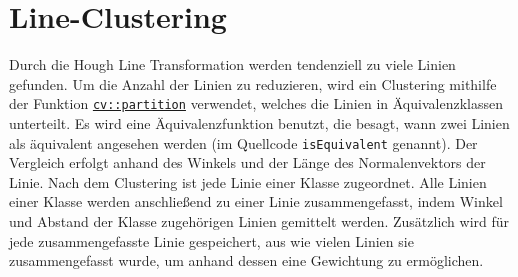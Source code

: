 \documentclass[a4paper,12pt]{report}
\begin{document}
\section{Line-Clustering}
	Durch die Hough Line Transformation werden tendenziell zu viele Linien gefunden.
	Um die Anzahl der Linien zu reduzieren, wird ein Clustering mithilfe der Funktion \href{https://docs.opencv.org/3.4.0/d5/d38/group\_\_core\_\_cluster.html\#ga2037c989e69b499c1aa271419f3a9b34}{\texttt{cv::partition}} \cite{opencv-doc} verwendet, welches die Linien in Äquivalenzklassen unterteilt.
	Es wird eine Äquivalenzfunktion benutzt, die besagt, wann zwei Linien als äquivalent angesehen werden (im Quellcode \texttt{isEquivalent} genannt).
	Der Vergleich erfolgt anhand des Winkels und der Länge des Normalenvektors der Linie.
	Nach dem Clustering ist jede Linie einer Klasse zugeordnet.
	Alle Linien einer Klasse werden anschließend zu einer Linie zusammengefasst, indem Winkel und Abstand der Klasse zugehörigen Linien gemittelt werden.
	Zusätzlich wird für jede zusammengefasste Linie gespeichert, aus wie vielen Linien sie zusammengefasst wurde, um anhand dessen eine Gewichtung zu ermöglichen.
\end{document}

